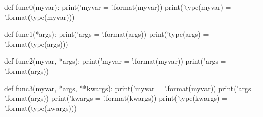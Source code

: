 \documentclass[multi, border=4]{standalone}
\begin{document}
\begin{fixedsizepythoncode}
def func0(myvar):
    print('myvar = {}'.format(myvar))
    print('type(myvar) = {}'.format(type(myvar)))

def func1(*args):
    print('args = {}'.format(args))
    print('type(args) = {}'.format(type(args)))

def func2(myvar, *args):
    print('myvar = {}'.format(myvar))
    print('args = {}'.format(args))

def func3(myvar, *args, **kwargs):
    print('myvar = {}'.format(myvar))
    print('args = {}'.format(args))
    print('kwargs = {}'.format(kwargs))
    print('type(kwargs) = {}'.format(type(kwargs)))
\end{fixedsizepythoncode}
\end{document}
